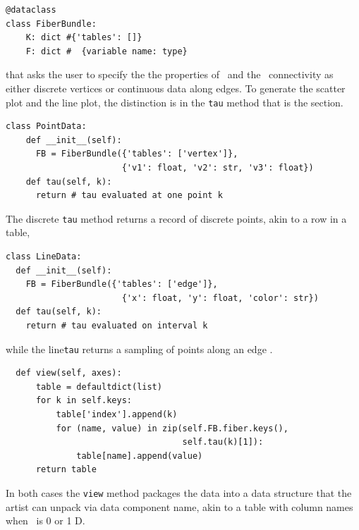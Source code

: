 \documentclass[journal]{vgtc}                %
\begin{document}
\begin{verbatim}
@dataclass
class FiberBundle:
    K: dict #{'tables': []}
    F: dict #  {variable name: type}
\end{verbatim}
that asks the user to specify the the properties of \dfiber\ and the \dbase\ connectivity as either discrete vertices or continuous data along edges. To generate the scatter plot and the line plot, the distinction is in the \texttt{tau} method that is the section. 
\begin{verbatim}
class PointData:     
    def __init__(self):
      FB = FiberBundle({'tables': ['vertex']},  
                       {'v1': float, 'v2': str, 'v3': float})
    def tau(self, k):
      return # tau evaluated at one point k
\end{verbatim}
The discrete \texttt{tau} method returns a record of discrete points, akin to a row in a table, 
\begin{verbatim}
class LineData:
  def __init__(self):
    FB = FiberBundle({'tables': ['edge']},  
                       {'x': float, 'y': float, 'color': str})
  def tau(self, k):
    return # tau evaluated on interval k
\end{verbatim}
while the line\texttt{tau} returns a sampling of points along an edge \dbasepoint.
\begin{verbatim}
  def view(self, axes):
      table = defaultdict(list)
      for k in self.keys:
          table['index'].append(k)
          for (name, value) in zip(self.FB.fiber.keys(), 
                                   self.tau(k)[1]):
              table[name].append(value)
      return table
\end{verbatim}
In both cases the \texttt{view} method packages the data into a data structure that the artist can unpack via data component name, akin to a table with column names when \dbase\ is 0 or 1 D. 
\end{document}
